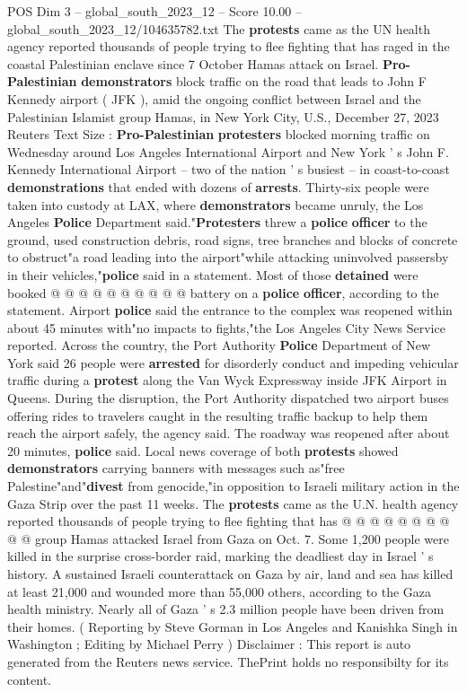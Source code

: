\begin{textsample}{POS Dim 3 – global\_south\_2023\_12 – Score 10.00 – global\_south\_2023\_12/104635782.txt}  \label{ex:f3_pos_418}
The \textbf{protests} came as the UN health agency reported thousands of people trying to flee fighting that has raged in the coastal Palestinian enclave since 7 October Hamas attack on Israel. \textbf{Pro-Palestinian} \textbf{demonstrators} block traffic on the road that leads to John F Kennedy airport ( JFK ), amid the ongoing conflict between Israel and the Palestinian Islamist group Hamas, in New York City, U.S., December 27, 2023 Reuters Text Size : \textbf{Pro-Palestinian} \textbf{protesters} blocked morning traffic on Wednesday around Los Angeles International Airport and New York ' s John F.
Kennedy International Airport -- two of the nation ' s busiest -- in coast-to-coast \textbf{demonstrations} that ended with dozens of \textbf{arrests}.
Thirty-six people were taken into custody at LAX, where \textbf{demonstrators} became unruly, the Los Angeles \textbf{Police} Department said."\textbf{Protesters} threw a \textbf{police} \textbf{officer} to the ground, used construction debris, road signs, tree branches and blocks of concrete to obstruct"a road leading into the airport"while attacking uninvolved passersby in their vehicles,"\textbf{police} said in a statement.
Most of those \textbf{detained} were booked @ @ @ @ @ @ @ @ @ @ battery on a \textbf{police} \textbf{officer}, according to the statement.
Airport \textbf{police} said the entrance to the complex was reopened within about 45 minutes with"no impacts to fights,"the Los Angeles City News Service reported.
Across the country, the Port Authority \textbf{Police} Department of New York said 26 people were \textbf{arrested} for disorderly conduct and impeding vehicular traffic during a \textbf{protest} along the Van Wyck Expressway inside JFK Airport in Queens.
During the disruption, the Port Authority dispatched two airport buses offering rides to travelers caught in the resulting traffic backup to help them reach the airport safely, the agency said.
The roadway was reopened after about 20 minutes, \textbf{police} said.
Local news coverage of both \textbf{protests} showed \textbf{demonstrators} carrying banners with messages such as"free Palestine"and"\textbf{divest} from genocide,"in opposition to Israeli military action in the Gaza Strip over the past 11 weeks.
The \textbf{protests} came as the U.N. health agency reported thousands of people trying to flee fighting that has @ @ @ @ @ @ @ @ @ @ group Hamas attacked Israel from Gaza on Oct. 7.
Some 1,200 people were killed in the surprise cross-border raid, marking the deadliest day in Israel ' s history.
A sustained Israeli counterattack on Gaza by air, land and sea has killed at least 21,000 and wounded more than 55,000 others, according to the Gaza health ministry.
Nearly all of Gaza ' s 2.3 million people have been driven from their homes. ( Reporting by Steve Gorman in Los Angeles and Kanishka Singh in Washington ; Editing by Michael Perry ) Disclaimer : This report is auto generated from the Reuters news service.
ThePrint holds no responsibilty for its content.

\end{textsample}
